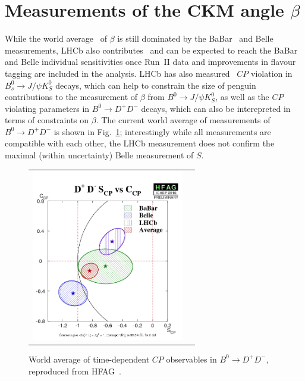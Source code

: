 \section{Measurements of the CKM angle $\beta$}
\label{sec:beta}

While the world average~\cite{HFAG} of $\beta$ is still dominated
by the BaBar~\cite{Aubert:2009aw} and Belle~\cite{Adachi:2012et} measurements, LHCb also contributes~\cite{LHCb-PAPER-2012-035} and can be expected
to reach the BaBar and Belle individual sensitivities once Run~II data and
improvements in flavour tagging are included in the analysis. LHCb has also measured~\cite{LHCb-PAPER-2015-005}
$CP$ violation in $B^0_s \to J/\psi K^0_S$ decays,
which can help to constrain the size of penguin contributions to the measurement
of $\beta$ from $B^0 \to J/\psi K^0_S$, as well as the $CP$ violating parameters in
$B^0 \to D^+ D^-$ decays, which can also be interepreted in terms of constraints on $\beta$.
The current world average of measurements of $B^0 \to D^+ D^-$ is shown in Fig.~\ref{b2ddwa}; 
interestingly while all measurements are compatible with each other, the LHCb measurement
does not confirm the maximal (within uncertainty) Belle measurement of $S$.

\begin{figure}
  \begin{center}
    \begin{tabular}{c c}
      \includegraphics[height=7.5cm]{figs/D+D-S_CPvsC_CP.png} &
    \end{tabular}
  \end{center}
  \vspace{-0.5cm}
  \caption{\label{b2ddwa}World average of time-dependent $CP$ observables in $B^0 \to D^+ D^-$, reproduced from HFAG~\cite{HFAG}.}
\end{figure}

